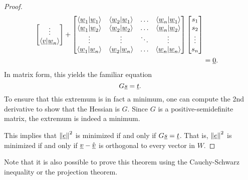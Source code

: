 \begin{proof}
\begin{equation*}
\begin{split}
\begin{bmatrix}
\vdots \\
\left\langle \underline{v} | \underline{w}_n \right\rangle
\end{bmatrix}
+ \begin{bmatrix}
\left\langle \underline{w}_1 | \underline{w}_1 \right\rangle &
\left\langle \underline{w}_2 | \underline{w}_1 \right\rangle & \hdots &
\left\langle \underline{w}_n | \underline{w}_1 \right\rangle \\
\left\langle \underline{w}_1 | \underline{w}_2 \right\rangle &
\left\langle \underline{w}_2 | \underline{w}_2 \right\rangle & \hdots &
\left\langle \underline{w}_n | \underline{w}_2 \right\rangle \\
\vdots & \vdots & \ddots & \vdots \\
\left\langle \underline{w}_1 | \underline{w}_n \right\rangle &
\left\langle \underline{w}_2 | \underline{w}_n \right\rangle & \hdots &
\left\langle \underline{w}_n | \underline{w}_n \right\rangle \\
\end{bmatrix}
\begin{bmatrix} s_1 \\ s_2 \\ \vdots \\ s_n \end{bmatrix} \\
&= \underline{0} .
\end{split}
\end{equation*}
In matrix form, this yields the familiar equation
\begin{equation*}
G \underline{s} = \underline{t}.
\end{equation*}
To ensure that this extremum is in fact a minimum, one can compute the 2nd derivative to show that the Hessian is $G$.
Since $G$ is a positive-semidefinite matrix, the extremum is indeed a minimum.

This implies that $\left\| \underline{e} \right\|^2$ is minimized if and only if $G \underline{s} = \underline{t}$.
That is, $\left\| \underline{e} \right\|^2$ is minimized if and only if $\underline{v} - \hat{\underline{v}}$ is orthogonal to every vector in $W$.
\end{proof}

Note that it is also possible to prove this theorem using the Cauchy-Schwarz inequality or the projection theorem.


